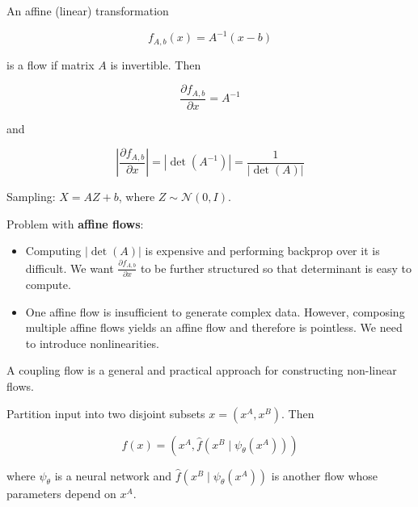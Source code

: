 \begin{definition}
    An affine (linear) transformation

    $$
    f_{A, b}(x)=A^{-1}(x-b)
    $$

    is a flow if matrix $A$ is invertible. Then

    $$
    \frac{\partial f_{A, b}}{\partial x}=A^{-1}
    $$

    and

    $$
    \left|\frac{\partial f_{A, b}}{\partial x}\right|=\left|\operatorname{det}\left(A^{-1}\right)\right|=\frac{1}{|\operatorname{det}(A)|}
    $$

    Sampling: $X=A Z+b$, where $Z \sim \mathcal{N}(0, I)$.

    Problem with \textbf{affine flows}:

    \begin{itemize}
        \item Computing $|\operatorname{det}(A)|$ is expensive and performing backprop over it is difficult. We want $\frac{\partial f_{A, b}}{\partial x}$ to be further structured so that determinant is easy to compute.
        \item One affine flow is insufficient to generate complex data. However, composing multiple affine flows yields an affine flow and therefore is pointless. We need to introduce nonlinearities.
    \end{itemize}
\end{definition}

\par\noindent\textcolor{gray}{\hdashrule{\textwidth}{0.4pt}{1pt 2pt}}

\begin{definition}
    A coupling flow is a general and practical approach for constructing non-linear flows.

    Partition input into two disjoint subsets $x=\left(x^{A}, x^{B}\right)$. Then

    $$
    f(x)=\left(x^{A}, \hat{f}\left(x^{B} \mid \psi_{\theta}\left(x^{A}\right)\right)\right)
    $$

    where $\psi_{\theta}$ is a neural network and $\hat{f}\left(x^{B} \mid \psi_{\theta}\left(x^{A}\right)\right)$ is another flow whose parameters depend on $x^{A}$.
\end{definition}

